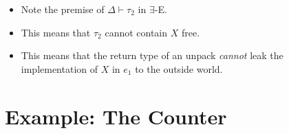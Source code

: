\documentclass{lecturenotes}
\newcommand{\pack}[3]{\ensuremath{\textsf{pack}\mkern5mu#1\mathrel{\textsf{as}}#2\mathrel{\textsf{in}}#3}}
\newcommand{\unpack}[4]{\ensuremath{\textsf{unpack}\mkern5mu#1\mathrel{\textsf{as}} #2, #3 \mathrel{\textsf{in}} #4}}
\begin{document}
\begin{itemize}
\item Note the premise of $\Delta \vdash \tau_2$ in \textsc{$\exists$-E}.
\item This means that $\tau_2$ cannot contain $X$ free.
\item This means that the return type of an \textsf{unpack} \emph{cannot} leak the implementation of $X$ in $e_1$ to the outside world.
\end{itemize}


\newpage
\section{Example: The Counter}
\label{sec:counter}
\end{document}
